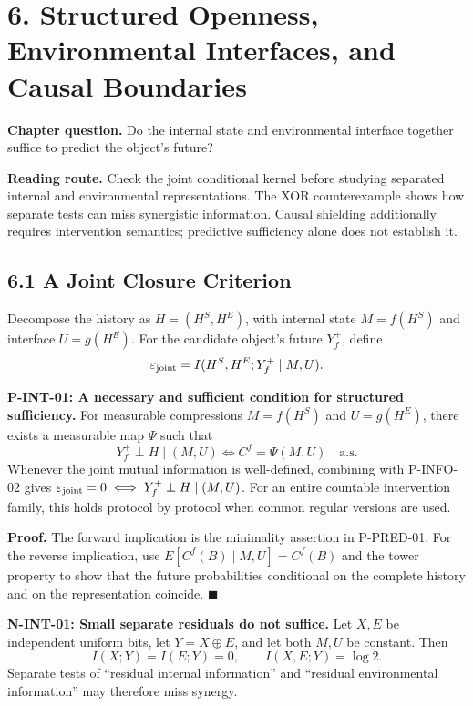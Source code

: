 \documentclass[
  english,
  11pt,
  oneside]{book}
\begin{document}
\chapter{6. Structured Openness, Environmental Interfaces, and Causal Boundaries}\label{ch-6}

\textbf{Chapter question.} Do the internal state and environmental interface together suffice to predict the object's future?

\textbf{Reading route.} Check the joint conditional kernel before studying separated internal and environmental representations. The XOR counterexample shows how separate tests can miss synergistic information. Causal shielding additionally requires intervention semantics; predictive sufficiency alone does not establish it.

\section{6.1 A Joint Closure Criterion}\label{a-joint-closure-criterion}

Decompose the history as \(H=(H^S,H^E)\), with internal state \(M=f(H^S)\) and interface \(U=g(H^E)\). For the candidate object's future \(Y_f^+\), define \[\varepsilon_{\rm joint}
=I(H^S,H^E;Y_f^+\mid M,U).\]

\hypertarget{p-int-01}{}\label{p-int-01}

\textbf{P-INT-01: A necessary and sufficient condition for structured sufficiency.} For measurable compressions \(M=f(H^S)\) and \(U=g(H^E)\), there exists a measurable map \(\Psi\) such that \[Y_f^+\perp H\mid(M,U)
\iff C^f=\Psi(M,U)\quad\text{a.s.}\] Whenever the joint mutual information is well-defined, combining with P-INFO-02 gives \(\varepsilon_{\rm joint}=0\iff Y_f^+\perp H\mid(M,U)\). For an entire countable intervention family, this holds protocol by protocol when common regular versions are used.

\textbf{Proof.} The forward implication is the minimality assertion in P-PRED-01. For the reverse implication, use \(E[C^f(B)\mid M,U]=C^f(B)\) and the tower property to show that the future probabilities conditional on the complete history and on the representation coincide. \(\blacksquare\)

\textbf{N-INT-01: Small separate residuals do not suffice.} Let \(X,E\) be independent uniform bits, let \(Y=X\oplus E\), and let both \(M,U\) be constant. Then \[I(X;Y)=I(E;Y)=0,\qquad I(X,E;Y)=\log2.\] Separate tests of ``residual internal information'' and ``residual environmental information'' may therefore miss synergy.
\end{document}
